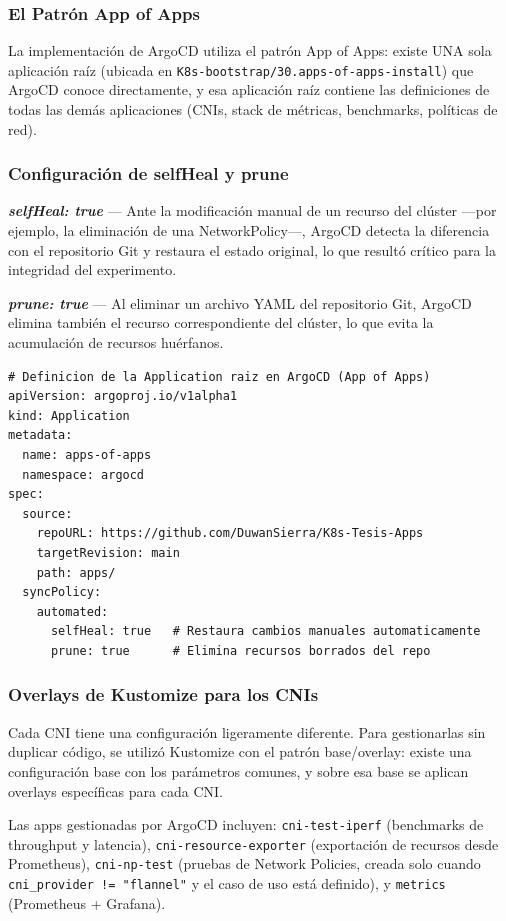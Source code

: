 \subsubsection{El Patrón App of Apps}

La implementación de ArgoCD utiliza el patrón App of Apps: existe UNA sola aplicación raíz (ubicada en \texttt{K8s-bootstrap/30.apps-of-apps-install}) que ArgoCD conoce directamente, y esa aplicación raíz contiene las definiciones de todas las demás aplicaciones (CNIs, stack de métricas, benchmarks, políticas de red).

\subsubsection{Configuración de selfHeal y prune}

\textbf{\emph{selfHeal: true}} --- Ante la modificación manual de un recurso del clúster ---por ejemplo, la eliminación de una NetworkPolicy---, ArgoCD detecta la diferencia con el repositorio Git y restaura el estado original, lo que resultó crítico para la integridad del experimento.

\textbf{\emph{prune: true}} --- Al eliminar un archivo YAML del repositorio Git, ArgoCD elimina también el recurso correspondiente del clúster, lo que evita la acumulación de recursos huérfanos.

\begin{lstlisting}
# Definicion de la Application raiz en ArgoCD (App of Apps)
apiVersion: argoproj.io/v1alpha1
kind: Application
metadata:
  name: apps-of-apps
  namespace: argocd
spec:
  source:
    repoURL: https://github.com/DuwanSierra/K8s-Tesis-Apps
    targetRevision: main
    path: apps/
  syncPolicy:
    automated:
      selfHeal: true   # Restaura cambios manuales automaticamente
      prune: true      # Elimina recursos borrados del repo
\end{lstlisting}

\subsubsection{Overlays de Kustomize para los CNIs}

Cada CNI tiene una configuración ligeramente diferente. Para gestionarlas sin duplicar código, se utilizó Kustomize con el patrón base/overlay: existe una configuración base con los parámetros comunes, y sobre esa base se aplican overlays específicas para cada CNI.

Las apps gestionadas por ArgoCD incluyen: \texttt{cni-test-iperf} (benchmarks de throughput y latencia), \texttt{cni-resource-exporter} (exportación de recursos desde Prometheus), \texttt{cni-np-test} (pruebas de Network Policies, creada solo cuando \texttt{cni\_provider != "flannel"} y el caso de uso está definido), y \texttt{metrics} (Prometheus + Grafana).

